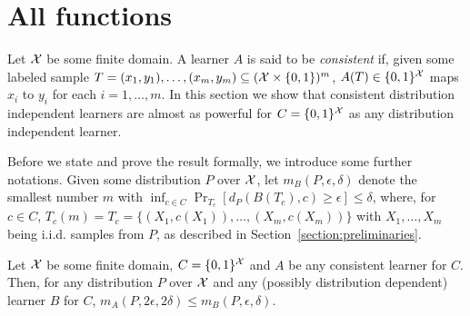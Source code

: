 \section{All functions}
\label{section:all-functions}

Let $\mathcal{X}$ be some finite domain.
A learner $A$ is said to be \emph{consistent} if, given some labeled sample $T = (x_1,y_1), \dots,(x_m,y_m) \subseteq (\mathcal{X} \times \{0,1\})^m$, $A(T) \in \{0,1\}^{\mathcal{X}}$ maps $x_i$ to $y_i$ for each $i=1,\dots, m$.
In this section we show that consistent distribution independent learners are almost as powerful for $C = \{0,1\}^{\mathcal{X}}$ as any distribution independent learner.

Before we state and prove the result formally, we introduce some further notations.
Given some distribution $P$ over $\mathcal{X}$,
let $m_B(P,\epsilon,\delta)$ denote the smallest number $m$ with $\inf_{c \in C} \Pr_{T_c}[d_P(B(T_c),c) \geq \epsilon] \leq \delta$, where, for $c \in C$, $T_c(m) = T_c = \{(X_1,c(X_1)), \dots, (X_m,c(X_m))\}$ with $X_1, \dots, X_m$ being i.i.d. samples from $P$, as described in Section~\ref{section:preliminaries}.


\begin{theorem}
Let $\mathcal{X}$ be some finite domain, $C = \{0,1\}^{\mathcal{X}}$ and $A$ be any consistent learner for $C$.
Then, for any distribution $P$ over $\mathcal{X}$ and any (possibly distribution dependent) learner $B$ for $C$,
\(
m_A(P,2\epsilon,2\delta) \leq m_B(P,\epsilon,\delta)
\).
\end{theorem}
 
